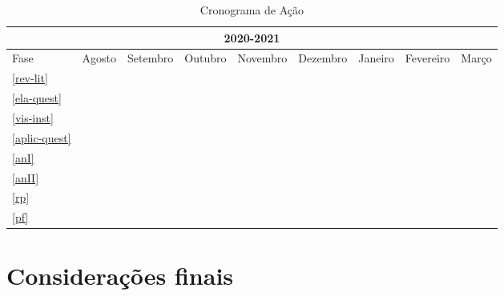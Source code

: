 \documentclass[
	arial,
	12pt,				%
	openright,			%
	oneside,
	a4paper,			%
	chapter=TITLE,		%
	english,			%
	french,				%
	spanish,			%
	brazil,				%
	]{abntex2}
\newcommand{\X}{\textbullet}
\begin{document}
	\begin{table}[htbp]
	  \centering
	  \begin{tabular}{|l||c|c|c|c|c|c|c|c|}
	    \hline
	    \multicolumn{9}{|c|}{\textbf{2020-2021}} \\
	    \hline
	    \hline
	    Fase  & Agosto & Setembro & Outubro & Novembro & Dezembro & Janeiro & Fevereiro &  Março \\
	    \hline
	    \ref{rev-lit}     & \X & \X & \X &     &      &      &     &     \\
	 \hline
	    \ref{ela-quest}     &     & \X & \X &     &      &      &     &      \\
	\hline
	    \ref{vis-inst}     &     &     & \X & \X  &      &     &     &      \\
	\hline
	    \ref{aplic-quest}     &     &     &     & \X &  \X &      &     &      \\
	\hline
	    \ref{anI}     &     &     &      &      &     & \X &      &       \\
	\hline
	    \ref{anII}     &     &     &      &      &      & \X & \X &       \\
	\hline
	    \ref{rp}     &     &     &      &      &      &      & \X &       \\
	\hline
	    \ref{pf}     &     &     &      &      &      &      &     & \X   \\
	    \hline
	    \hline
	  \end{tabular}
	  \caption{Cronograma de Ação}%
	  \label{tab:bullets}
	\end{table}


%


\chapter{Considerações finais}
\end{document}
